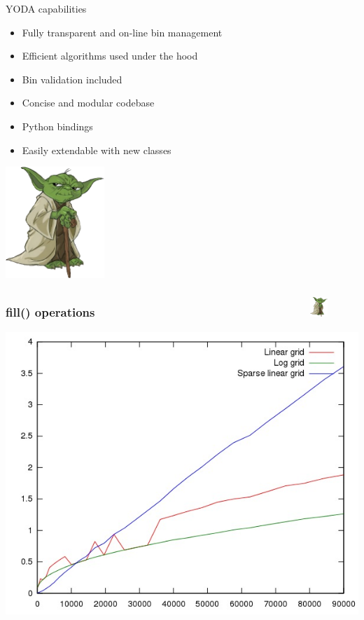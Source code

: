 \documentclass{beamer}
\begin{document}
  \begin{frame}{YODA capabilities}
    \begin{itemize}
      \item Fully transparent and on-line bin management
      \item Efficient algorithms used under the hood
      \item Bin validation included
      \item Concise and modular codebase
      \item Python bindings 
      \item Easily extendable with new classes
    \end{itemize}
    \includegraphics[width=0.28\textwidth]{yoda-logo}
  \end{frame}

  \begin{frame}
      \frametitle{fill() operations \ \ \ \ \ \ \ \ \ \ \ \ \ \ \ \ \ \ \ \ \ \ \ \ \ \ \ \ \ \ \ \   \includegraphics[width=0.05\textwidth]{yoda-logo}}
      \includegraphics[height=0.89\textheight]{1.jpg}
  \end{frame}
\end{document}
